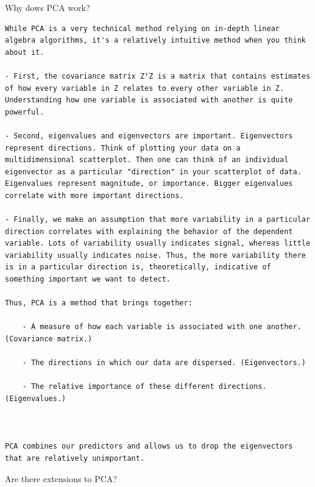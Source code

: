 \documentclass[
]{book}
\begin{document}
Why dows PCA work?

\begin{verbatim}
While PCA is a very technical method relying on in-depth linear algebra algorithms, it's a relatively intuitive method when you think about it.

- First, the covariance matrix ZᵀZ is a matrix that contains estimates of how every variable in Z relates to every other variable in Z. Understanding how one variable is associated with another is quite powerful.

- Second, eigenvalues and eigenvectors are important. Eigenvectors represent directions. Think of plotting your data on a multidimensional scatterplot. Then one can think of an individual eigenvector as a particular "direction" in your scatterplot of data. Eigenvalues represent magnitude, or importance. Bigger eigenvalues correlate with more important directions.

- Finally, we make an assumption that more variability in a particular direction correlates with explaining the behavior of the dependent variable. Lots of variability usually indicates signal, whereas little variability usually indicates noise. Thus, the more variability there is in a particular direction is, theoretically, indicative of something important we want to detect.

Thus, PCA is a method that brings together:

    - A measure of how each variable is associated with one another. (Covariance matrix.)

    - The directions in which our data are dispersed. (Eigenvectors.)

    - The relative importance of these different directions. (Eigenvalues.)



PCA combines our predictors and allows us to drop the eigenvectors that are relatively unimportant.
\end{verbatim}

Are there extensions to PCA?
\end{document}
